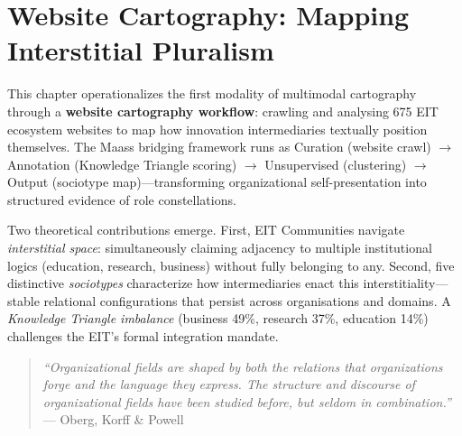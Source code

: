 \documentclass[../main.tex]{subfiles}
\begin{document}
\chapter{Website Cartography: Mapping Interstitial Pluralism}
\margintoc


\begin{chapteroverview}
This chapter operationalizes the first modality of multimodal cartography through a \textbf{website cartography workflow}: crawling and analysing 675 EIT ecosystem websites to map how innovation intermediaries textually position themselves. The Maass bridging framework runs as Curation (website crawl) $\rightarrow$ Annotation (Knowledge Triangle scoring) $\rightarrow$ Unsupervised (clustering) $\rightarrow$ Output (sociotype map)---transforming organizational self-presentation into structured evidence of role constellations.

Two theoretical contributions emerge. First, EIT Communities navigate \emph{interstitial space}: simultaneously claiming adjacency to multiple institutional logics (education, research, business) without fully belonging to any. Second, five distinctive \emph{sociotypes} characterize how intermediaries enact this interstitiality---stable relational configurations that persist across organisations and domains. A \emph{Knowledge Triangle imbalance} (business 49\%, research 37\%, education 14\%) challenges the EIT's formal integration mandate.
\end{chapteroverview}

\begin{quote}
\textit{``Organizational fields are shaped by both the relations that organizations forge and the language they express. The structure and discourse of organizational fields have been studied before, but seldom in combination.''}\\
--- Oberg, Korff \& Powell \citeyear{oberg2017culture}
\end{quote}
\end{document}

